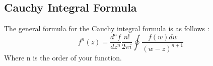 \documentclass{article}
\newcommand{\be}{\begin{equation}}
\newcommand{\ee}{\end{equation}}
\begin{document}
\subsection*{Cauchy Integral Formula}
The general formula for the Cauchy integral formula is as follows :
\be
f^{n}(z) = \frac{d^n f}{dz^n}  \frac{n!}{2\pi i } \oint \frac{f(w) dw}{(w-z)^{n+1}}
\ee
Where n is the order of your function.
\end{document}

